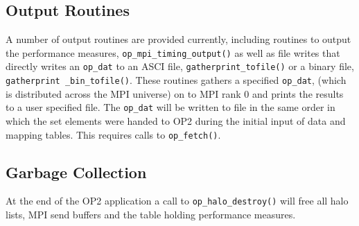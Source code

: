 \documentclass[11pt]{article}
\begin{document}
\subsection{Output Routines}\label{subsec/output}
A number of output routines are provided currently, including routines to output the performance measures,
\texttt{op\_mpi\_timing\_output()} as well as file writes that directly writes an \texttt{op\_dat} to an ASCI file,
\texttt{gatherprint\_tofile()} or a binary file, \texttt{gatherprint \_bin\_tofile()}. These routines gathers a
specified
\texttt{op\_dat}, (which is distributed across the MPI universe) on to MPI rank 0 and prints the results to a user
specified file. The \texttt{op\_dat} will be written to file in the same order in which the set elements were handed to
OP2 during the initial input of data and mapping tables. This requires calls to \texttt{op\_fetch()}.

\subsection{Garbage Collection}\label{subsec/cleanup}
At the end of the OP2 application a call to \texttt{op\_halo\_destroy()} will free all halo lists, MPI send buffers and
the table holding performance measures.

\newpage
\end{document}
